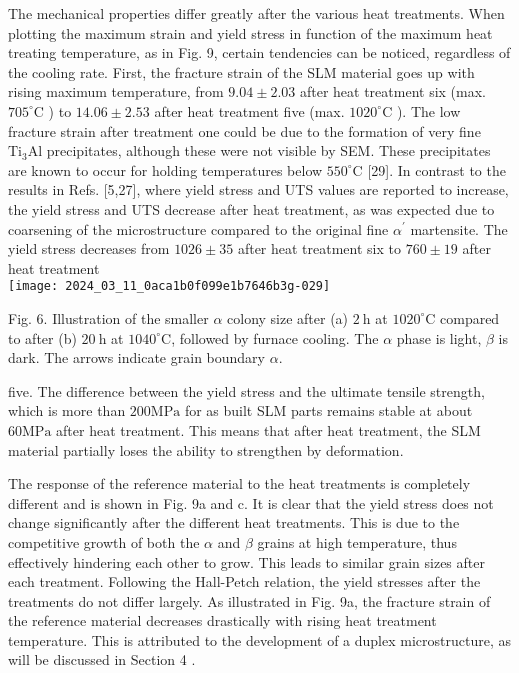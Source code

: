 \documentclass[10pt]{article}
\begin{document}
The mechanical properties differ greatly after the various heat treatments. When plotting the maximum strain and yield stress in function of the maximum heat treating temperature, as in Fig. 9, certain tendencies can be noticed, regardless of the cooling rate. First, the fracture strain of the SLM material goes up with rising maximum temperature, from $9.04 \pm 2.03$ after heat treatment six (max. $705^{\circ} \mathrm{C}$ ) to $14.06 \pm 2.53$ after heat treatment five (max. $1020^{\circ} \mathrm{C}$ ). The low fracture strain after treatment one could be due to the formation of very fine $\mathrm{Ti}_{3} \mathrm{Al}$ precipitates, although these were not visible by SEM. These precipitates are known to occur for holding temperatures below $550^{\circ} \mathrm{C}$ [29]. In contrast to the results in Refs. [5,27], where yield stress and UTS values are reported to increase, the yield stress and UTS decrease after heat treatment, as was expected due to coarsening of the microstructure compared to the original fine $\alpha^{\prime}$ martensite. The yield stress decreases from $1026 \pm 35$ after heat treatment six to $760 \pm 19$ after heat treatment\\
\texttt{[image: 2024\_03\_11\_0aca1b0f099e1b7646b3g-029]}

Fig. 6. Illustration of the smaller $\alpha$ colony size after (a) $2 \mathrm{~h}$ at $1020^{\circ} \mathrm{C}$ compared to after (b) $20 \mathrm{~h}$ at $1040^{\circ} \mathrm{C}$, followed by furnace cooling. The $\alpha$ phase is light, $\beta$ is dark. The arrows indicate grain boundary $\alpha$.

five. The difference between the yield stress and the ultimate tensile strength, which is more than $200 \mathrm{MPa}$ for as built SLM parts remains stable at about $60 \mathrm{MPa}$ after heat treatment. This means that after heat treatment, the SLM material partially loses the ability to strengthen by deformation.

The response of the reference material to the heat treatments is completely different and is shown in Fig. 9a and c. It is clear that the yield stress does not change significantly after the different heat treatments. This is due to the competitive growth of both the $\alpha$ and $\beta$ grains at high temperature, thus effectively hindering each other to grow. This leads to similar grain sizes after each treatment. Following the Hall-Petch relation, the yield stresses after the treatments do not differ largely. As illustrated in Fig. 9a, the fracture strain of the reference material decreases drastically with rising heat treatment temperature. This is attributed to the development of a duplex microstructure, as will be discussed in Section 4 .
\end{document}
